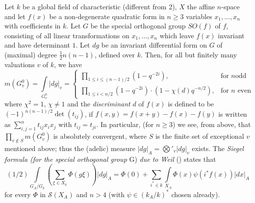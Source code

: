 Let $k$ be a global field of characteristic (different from 2), $X$
the affine $n$-space and let $f(x)$ be a non-degenerate quadratic form
in $n\geq 3$ variables $x_{1},\ldots,x_{n}$ with coefficients in
$k$. Let $G$ be the special orthogonal group $SO(f)$ of $f$,
consisting of all linear transformations on $x_{1},\ldots,x_{n}$ which
leave $f(x)$ invariant and have determinant $1$. Let $dg$ be an
invariant differential form on $G$ of (maximal) degree
$\frac{1}{2}n(n-1)$, defined over $k$. Then, for all but finitely many
valuations $v$ of $k$, we have
$$
m(G^{0}_{v})=\int\limits_{G^{0}_{v}}|dg|_{v}=
\begin{cases}
\prod\limits_{1\leq i\leq(n-1)/2}(1-q^{-2i}), & \text{for } n \text{
  odd}\\[5pt]
\prod\limits_{1\leq i<n/2}(1-q^{-2i})\cdot (1-\chi(d)q^{-n/2}), & \text{for }
n \text{ even} 
\end{cases}
$$
where $\chi^{2}=1$, $\chi\neq 1$ and the {\em discriminant} $d$ of
$f(x)$ is defined to be $(-1)^{n(n-1)/2}\det (t_{ij})$, if
$f(x,y)=f(x+y)-f(x)-f(y)$ is written as
$\sum\limits^{n}_{i,j=1}t_{ij}x_{i}x_{j}$ with\pageoriginale
$t_{ij}=t_{ji}$. In particular, (for $n\geq 3$) we see, from above,
that $\prod\limits_{v\not\in S}m(G^{0}_{v})$ is absolutely convergent,
where $S$ is the finite set of exceptional $v$ mentioned above; thus
the (adelic) measure $|dg|_{A}=\bigotimes'_{v}|dg|_{v}$ exists. The
{\em Siegel formula (for the special orthogonal group} G) {\em due to
  Weil} (\cite{Wei 5}) states that
\begin{equation*}
  (1/2)\int\limits_{G_{A}/G_{k}}\left(\sum_{\xi\in
    X_{k}}\Phi(g\xi)\right)|dg|_{A}=\Phi(0)+ \sum_{i^{\ast}\in k}
  \int\limits_{X_{A}}\Phi(x)\psi(i^{\ast}f(x))|dx|_{A}\tag{117}
  \label{chap4:sec3:subsec1:eq117}
\end{equation*}
for every $\Phi$ in $\mathscr{S}(X_{A})$ and $n>4$ (with $\psi\in
(k_{A}/k)^{\ast}$ chosen already).

\subsection{}\label{chap4:sec3:subsec2} %

